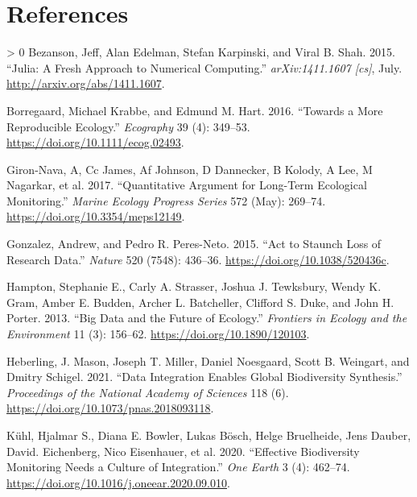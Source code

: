 \documentclass[10pt,oneside]{article}
\newlength{\cslhangindent}
\newenvironment{CSLReferences}[3] %
 {%
  \setlength{\parindent}{0pt}
  \ifodd #1 \everypar{\setlength{\hangindent}{\cslhangindent}}\ignorespaces\fi
  \ifnum #2 > 0
  \setlength{\parskip}{#2\baselineskip}
  \fi
 }%
 {}
\begin{document}
\hypertarget{references}{%
\section*{References}\label{references}}

\hypertarget{refs}{}
\begin{CSLReferences}{1}{0}
\leavevmode\hypertarget{ref-Bezanson2015JulFre}{}%
Bezanson, Jeff, Alan Edelman, Stefan Karpinski, and Viral B. Shah. 2015.
{``Julia: A Fresh Approach to Numerical Computing.''}
\emph{arXiv:1411.1607 {[}cs{]}}, July.
\url{http://arxiv.org/abs/1411.1607}.

\leavevmode\hypertarget{ref-Borregaard2016MorRep}{}%
Borregaard, Michael Krabbe, and Edmund M. Hart. 2016. {``Towards a More
Reproducible Ecology.''} \emph{Ecography} 39 (4): 349--53.
\url{https://doi.org/10.1111/ecog.02493}.

\leavevmode\hypertarget{ref-Giron-Nava2017QuaArg}{}%
Giron-Nava, A, Cc James, Af Johnson, D Dannecker, B Kolody, A Lee, M
Nagarkar, et al. 2017. {``Quantitative Argument for Long-Term Ecological
Monitoring.''} \emph{Marine Ecology Progress Series} 572 (May): 269--74.
\url{https://doi.org/10.3354/meps12149}.

\leavevmode\hypertarget{ref-Gonzalez2015ActSta}{}%
Gonzalez, Andrew, and Pedro R. Peres-Neto. 2015. {``Act to Staunch Loss
of Research Data.''} \emph{Nature} 520 (7548): 436--36.
\url{https://doi.org/10.1038/520436c}.

\leavevmode\hypertarget{ref-Hampton2013BigDat}{}%
Hampton, Stephanie E., Carly A. Strasser, Joshua J. Tewksbury, Wendy K.
Gram, Amber E. Budden, Archer L. Batcheller, Clifford S. Duke, and John
H. Porter. 2013. {``Big Data and the Future of Ecology.''}
\emph{Frontiers in Ecology and the Environment} 11 (3): 156--62.
\url{https://doi.org/10.1890/120103}.

\leavevmode\hypertarget{ref-Heberling2021DatInt}{}%
Heberling, J. Mason, Joseph T. Miller, Daniel Noesgaard, Scott B.
Weingart, and Dmitry Schigel. 2021. {``Data Integration Enables Global
Biodiversity Synthesis.''} \emph{Proceedings of the National Academy of
Sciences} 118 (6). \url{https://doi.org/10.1073/pnas.2018093118}.

\leavevmode\hypertarget{ref-Kuhl2020EffBio}{}%
Kühl, Hjalmar S., Diana E. Bowler, Lukas Bösch, Helge Bruelheide, Jens
Dauber, David. Eichenberg, Nico Eisenhauer, et al. 2020. {``Effective
Biodiversity Monitoring Needs a Culture of Integration.''} \emph{One
Earth} 3 (4): 462--74.
\url{https://doi.org/10.1016/j.oneear.2020.09.010}.


\end{CSLReferences}
\end{document}
